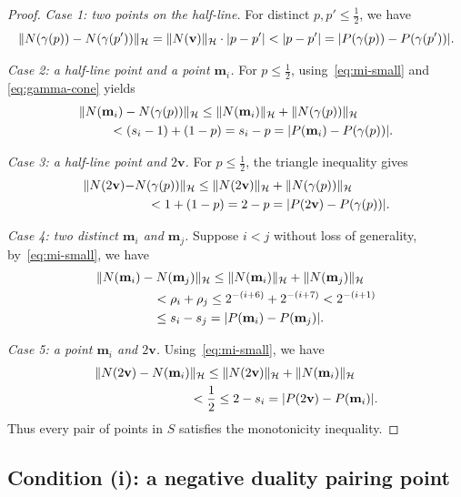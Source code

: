 \documentclass[11pt,a4paper]{article}
\theoremstyle{reportstyle}
\numberwithin{equation}{section}
\newcommand{\HH}{\mathcal H}
\newcommand{\bv}{\mathbf v}
\newcommand{\bm}{\mathbf m}
\DeclarePairedDelimiter{\norm}{\lVert}{\rVert}
\DeclarePairedDelimiter{\abs}{\lvert}{\rvert}
\begin{document}
\begin{proof}
		\noindent\emph{Case 1: two points on the half-line.}
		For distinct $p,p'\le\tfrac12$, we have
		$$ \norm{N(\gamma(p))-N(\gamma(p'))}_{\HH} = \norm{N(\bv)}_{\HH}\cdot\abs{p-p'} < \abs{p-p'} = \abs{P(\gamma(p))- P(\gamma(p'))}. $$

		\smallskip
		\noindent
		\emph{Case 2: a half-line point and a point $\bm_i$.}
		For $p\le\tfrac12$, using~\eqref{eq:mi-small} and
		\eqref{eq:gamma-cone} yields
		\begin{align*}
			\norm{N&(\bm_i) -N(\gamma(p))}_{\HH} \le \norm{N(\bm_i)}_{\HH} + \norm{N(\gamma(p))}_{\HH}\\
			& \quad < (s_i-1)+(1-p) = s_i-p = \abs{P(\bm_i)-P(\gamma(p))}.
		\end{align*}

		\smallskip
		\noindent
		\emph{Case 3: a half-line point and $2\bv$.}
		For $p\le\tfrac12$, the triangle inequality gives
		\begin{align*}
			\norm{N(2\bv) - &N(\gamma(p))}_{\HH}  \le \norm{N(2\bv)}_{\HH} + \norm{N(\gamma(p))}_{\HH}\\
			& \quad < 1+(1-p) = 2-p = \abs{P(2\bv)-P(\gamma(p))}.
		\end{align*}

		\smallskip
		\noindent
		\emph{Case 4: two distinct  $\bm_i$ and $\bm_j$.}
		Suppose $i<j$ without loss of generality, by~\eqref{eq:mi-small}, we have
		\begin{align*}
			\norm{N(\bm_i) & - N(\bm_j)}_{\HH} \le \norm{N(\bm_i)}_{\HH} +
			\norm{N(\bm_j)}_{\HH}\\
			&\quad < \rho_i+\rho_j \le 2^{-(i+6)}+2^{-(i+7)} < 2^{-(i+1)}\\
			& \quad \le s_i-s_j = \abs{P(\bm_i)-P(\bm_j)}.
		\end{align*}

		\smallskip
		\noindent
		\emph{Case 5: a point $\bm_i$ and $2\bv$.}
		Using~\eqref{eq:mi-small}, we have
		\begin{align*}
			\norm{N(2\bv)-N(\bm_i)&}_{\HH}
			\le \norm{N(2\bv)}_{\HH} + \norm{N(\bm_i)}_{\HH} \\
			& < \frac12 \le 2-s_i = \abs{P(2\bv)-P(\bm_i)}.
		\end{align*}
		Thus every pair of points in $S$ satisfies the monotonicity inequality.
	\end{proof}

	\subsection{Condition (i): a negative duality pairing point}
	\label{subsec:negative}
\end{document}
